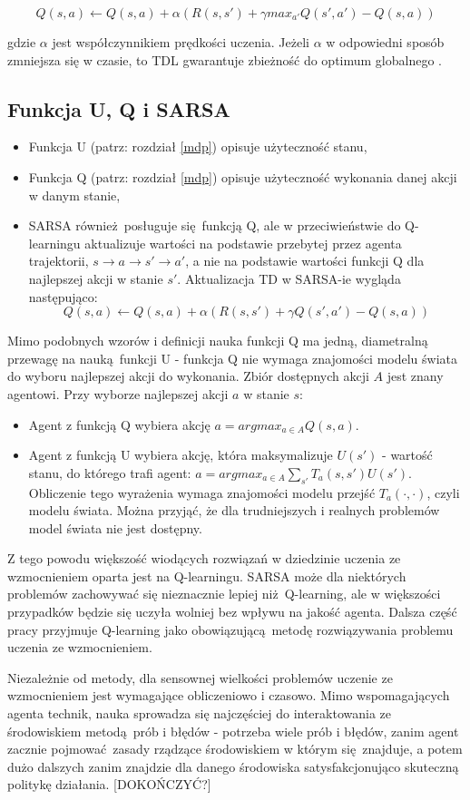 $$Q(s,a) \leftarrow Q(s,a) + \alpha (R(s,s') + \gamma max_{a'}Q(s',a') - Q (s,a))$$


gdzie $\alpha$ jest współczynnikiem prędkości uczenia. Jeżeli $\alpha$ w odpowiedni sposób zmniejsza się w czasie, to TDL gwarantuje zbieżność do optimum globalnego \cite{wjaskowski2016}. 

\subsection{Funkcja U, Q i SARSA}
\begin{itemize}
\item Funkcja U (patrz: rozdział \ref{mdp}) opisuje użyteczność stanu,
\item Funkcja Q (patrz: rozdział \ref{mdp}) opisuje użyteczność wykonania danej akcji w danym stanie,
\item SARSA również posługuje się funkcją Q, ale w przeciwieństwie do Q-learningu aktualizuje wartości na podstawie przebytej przez agenta trajektorii, $ s \rightarrow a \rightarrow s' \rightarrow a'$, a nie na podstawie wartości funkcji Q dla najlepszej akcji w stanie $s'$. Aktualizacja TD w SARSA-ie wygląda następująco:
$$Q(s,a) \leftarrow Q(s,a) + \alpha (R(s,s') + \gamma Q(s',a') - Q (s,a))$$
\end{itemize}

Mimo podobnych wzorów i definicji nauka funkcji Q ma jedną, diametralną przewagę na nauką funkcji U - funkcja Q nie wymaga znajomości modelu świata do wyboru najlepszej akcji do wykonania. Zbiór dostępnych akcji $A$ jest znany agentowi. Przy wyborze najlepszej akcji $a$ w stanie $s$:
\begin{itemize}
\item Agent z funkcją Q wybiera akcję $a = argmax_{a \in A} Q(s,a)$.

\item Agent z funkcją U wybiera akcję, która maksymalizuje $U(s')$ - wartość stanu, do którego trafi agent: $a = argmax_{a \in A} \sum_{s'} T_a(s,s')U(s')$. Obliczenie tego wyrażenia wymaga znajomości modelu przejść $T_a(\cdot, \cdot)$, czyli modelu świata. Można przyjąć, że dla trudniejszych i realnych problemów model świata nie jest dostępny.
\end{itemize}

Z tego powodu większość wiodących rozwiązań w dziedzinie uczenia ze wzmocnieniem oparta jest na Q-learningu. SARSA może dla niektórych problemów zachowywać się nieznacznie lepiej niż Q-learning, ale w większości przypadków będzie się uczyła wolniej bez wpływu na jakość agenta. Dalsza część pracy przyjmuje Q-learning jako obowiązującą metodę rozwiązywania problemu uczenia ze wzmocnieniem.

Niezależnie od metody, dla sensownej wielkości problemów uczenie ze wzmocnieniem jest wymagające obliczeniowo i czasowo. Mimo wspomagających agenta technik, nauka sprowadza się najczęściej do interaktowania ze środowiskiem metodą prób i błędów - potrzeba wiele prób i błędów, zanim agent zacznie pojmować zasady rządzące środowiskiem w którym się znajduje, a potem dużo dalszych zanim znajdzie dla danego środowiska satysfakcjonująco skuteczną politykę działania.
[DOKOŃCZYĆ?]

